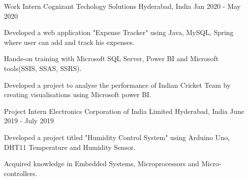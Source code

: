\begin{cventries}
  \cventry
    {Work Intern} %
    {Cognizant Techology Solutions} %
    {Hyderabad, India} %
    { Jan 2020 - May 2020 } %
    {
      \begin{cvitems} %
        \item {Developed a web application "Expense Tracker" using Java, MySQL, Spring where user can add and track his expenses.}
        \item {Hands-on training with Microsoft SQL Server, Power BI and Microsoft tools(SSIS, SSAS, SSRS).}
        \item {Developed a project to analyse the performance of Indian Cricket Team by creating visualisations using Microsoft power BI.}
      \end{cvitems}
    }
  \cventry
    {Project Intern} %
    {Electronics Corporation of India Limited} %
    {Hyderabad, India} %
    { June 2019 - July 2019} %
    {
      \begin{cvitems} %
        \item {Developed a project titled "Humidity Control System" using Arduino Uno, DHT11 Temperature and Humidity Sensor.}
        \item {Acquired knowledge in Embedded Systems, Microprocessors and Micro-controllers.}
      \end{cvitems}
    }

\end{cventries}
